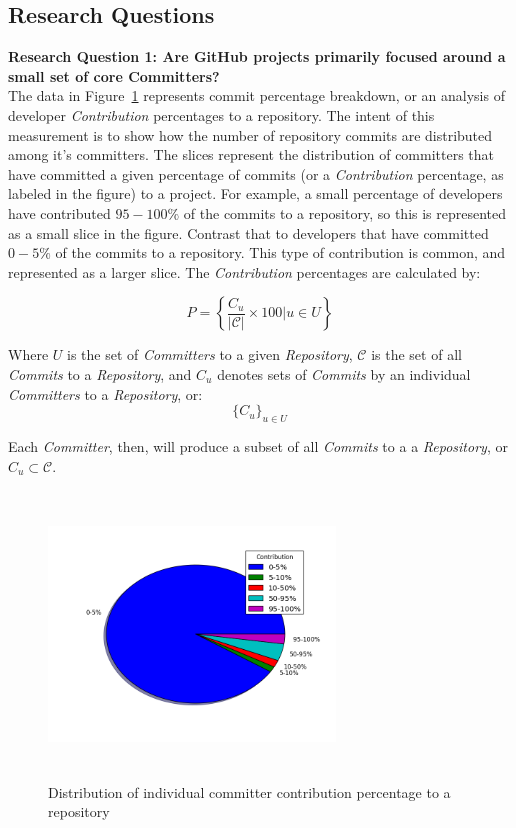 \documentclass{proc}
\begin{document}
{{{{{\subsection{Research Questions}
\noindent \textbf{Research Question 1: Are GitHub projects primarily focused around a small set of core Committers?}\\
The data in Figure~\ref{fig:committers_percentage_pie_chart} represents commit percentage breakdown, or an analysis of developer \textit{Contribution} percentages to a repository. The intent of this measurement is to show how the number of repository commits are distributed among it's committers. The slices represent the distribution of committers that have committed a given percentage of commits (or a \textit{Contribution} percentage, as labeled in the figure) to a project. For example, a small percentage of developers have contributed $95-100\%$ of the commits to a repository, so this is represented as a small slice in the figure. Contrast that to developers that have committed $0-5\%$ of the commits to a repository. This type of contribution is common, and represented as a larger slice. The \textit{Contribution} percentages are calculated by:

\begin{equation}
P = \left\{ \frac{ C_u } { |\mathscr{C}| } \times 100 \Big| u \in U \right\}
\label{eq:commit_percentage}
\end{equation}

Where $U$ is the set of \textit{Committers} to a given \textit{Repository}, $\mathscr{C}$ is the set of all \textit{Commits} to a \textit{Repository}, and $C_u$ denotes sets of \textit{Commits} by an individual \textit{Committers} to a \textit{Repository}, or:
 \[ \{ C_u \}_{u \in U} \]

Each \textit{Committer}, then, will produce a subset of all \textit{Commits} to a a \textit{Repository}, or $C_u \subset \mathscr{C}$. 

\begin{figure}
\includegraphics[height=3in,width=3in]{images/committers_percentage_pie_chart.png}
\caption{Distribution of individual committer contribution percentage to a repository}
\label{fig:committers_percentage_pie_chart}
\end{figure}

}}}}}
\end{document}
